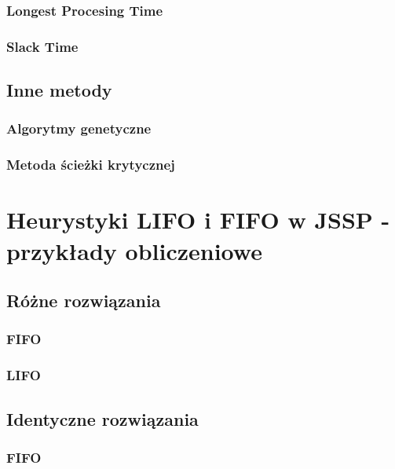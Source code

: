 \documentclass[twoside]{pracaInzynierskaMS}
\begin{document}
\subsubsection  {Longest Procesing Time}

\subsubsection  {Slack Time}

\subsection     {Inne metody}
\subsubsection  {Algorytmy genetyczne}

\subsubsection  {Metoda ścieżki krytycznej}


\section        [Heurystyki LIFO i FIFO \ldots]
                 {Heurystyki LIFO i FIFO w JSSP \newline - przykłady obliczeniowe}

\subsection     {Różne rozwiązania}
\subsubsection  {FIFO}

\subsubsection  {LIFO}

\subsection     {Identyczne rozwiązania}
\subsubsection  {FIFO}
\end{document}
